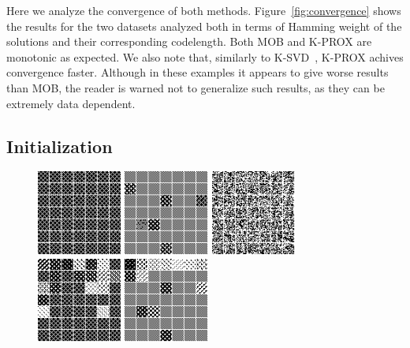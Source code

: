\documentclass[twocolumn]{IEEEtran}
\theoremstyle{definition}
\begin{document}
Here we analyze the convergence of both methods. Figure~\ref{fig:convergence} shows the results for the two datasets analyzed both in terms of Hamming weight of the solutions and their corresponding codelength. Both MOB and K-PROX are monotonic as expected. We also note that, similarly to K-SVD~\cite{ksvd}, K-PROX achives convergence faster.  Although in these examples it appears to give worse results than MOB, the reader is warned not to generalize such results, as they can be extremely data dependent.

\subsection{Initialization}

\begin{figure}[t]
\includegraphics[height=1.1in]{fig/einstein_init_part0.png} %
\includegraphics[height=1.1in]{fig/einstein_init_neigh0.png} %
\includegraphics[height=1.1in]{fig/einstein_init_rand0.png}\\[1ex]%
\includegraphics[height=1.1in]{fig/einstein_init_part1.png} %
\includegraphics[height=1.1in]{fig/einstein_init_neigh1.png} %

\end{figure}
\end{document}
